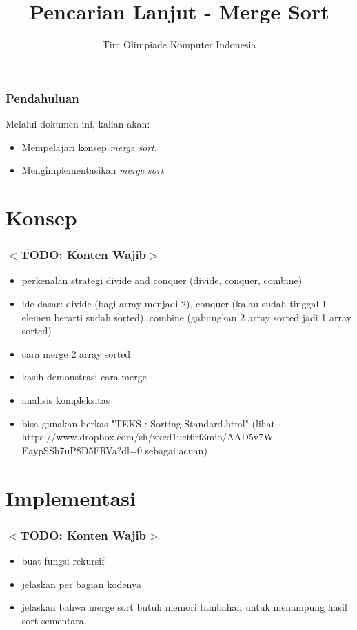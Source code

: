 

\title{Pencarian Lanjut - Merge Sort}
\author{Tim Olimpiade Komputer Indonesia}
\date{}



\begin{frame}
\titlepage
\end{frame}

\begin{frame}
\frametitle{Pendahuluan}
Melalui dokumen ini, kalian akan:
\begin{itemize}
  \item Mempelajari konsep \textit{merge sort}.
  \item Mengimplementasikan \textit{merge sort}.
\end{itemize}
\end{frame}

\section{Konsep}
\frame{\sectionpage}

\begin{frame}
\frametitle{$<$TODO: Konten Wajib$>$}
\begin{itemize}
  \item perkenalan strategi divide and conquer (divide, conquer, combine)
  \item ide dasar: divide (bagi array menjadi 2), conquer (kalau sudah tinggal 1 elemen berarti sudah sorted), combine (gabungkan 2 array sorted jadi 1 array sorted)
  \item cara merge 2 array sorted
  \item kasih demonstrasi cara merge
  \item analisis kompleksitas
  \item bisa gunakan berkas "TEKS : Sorting Standard.html"  (lihat  https://www.dropbox.com/sh/zxcd1uct6rf3mio/AAD5v7W-EaypSSh7uP8D5FRVa?dl=0 sebagai acuan)
\end{itemize}
\end{frame}

\section{Implementasi}
\frame{\sectionpage}

\begin{frame}
\frametitle{$<$TODO: Konten Wajib$>$}
\begin{itemize}
  \item buat fungsi rekursif
  \item jelaskan per bagian kodenya
  \item jelaskan bahwa merge sort butuh memori tambahan untuk menampung hasil sort sementara
\end{itemize}
\end{frame}


